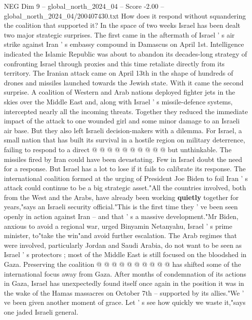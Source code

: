 \begin{textsample}{NEG Dim 9 – global\_north\_2024\_04 – Score -2.00 – global\_north\_2024\_04/200407430.txt}  \label{ex:f9_neg_222}
How does it respond without squandering the coalition that supported it?
In the space of two weeks Israel has been dealt two major strategic surprises.
The first came in the aftermath of Israel ' s air strike against Iran ' s embassy compound in Damascus on April 1st.
Intelligence indicated the Islamic Republic was about to abandon its decades-long strategy of confronting Israel through proxies and this time retaliate directly from its territory.
The Iranian attack came on April 13th in the shape of hundreds of drones and missiles launched towards the Jewish state.
With it came the second surprise.
A coalition of Western and Arab nations deployed fighter jets in the skies over the Middle East and, along with Israel ' s missile-defence systems, intercepted nearly all the incoming threats.
Together they reduced the immediate impact of the attack to one wounded girl and some minor damage to an Israeli air base.
But they also left Israeli decision-makers with a dilemma.
For Israel, a small nation that has built its survival in a hostile region on military deterrence, failing to respond to a direct @ @ @ @ @ @ @ @ @ @ but unthinkable.
The missiles fired by Iran could have been devastating.
Few in Israel doubt the need for a response.
But Israel has a lot to lose if it fails to calibrate its response.
The international coalition formed at the urging of President Joe Biden to foil Iran ' s attack could continue to be a big strategic asset."All the countries involved, both from the West and the Arabs, have already been working \textbf{quietly} together for years,"says an Israeli security official."This is the first time they ' ve been seen openly in action against Iran -- and that ' s a massive development."Mr Biden, anxious to avoid a regional war, urged Binyamin Netanyahu, Israel ' s prime minister, to"take the win"and avoid further escalation.
The Arab regimes that were involved, particularly Jordan and Saudi Arabia, do not want to be seen as Israel ' s protectors ; most of the Middle East is still focused on the bloodshed in Gaza.
Preserving the coalition @ @ @ @ @ @ @ @ @ @ has shifted some of the international focus away from Gaza.
After months of condemnation of its actions in Gaza, Israel has unexpectedly found itself once again in the position it was in the wake of the Hamas massacres on October 7th -- supported by its allies."We ' ve been given another moment of grace.
Let ' s see how quickly we waste it,"says one jaded Israeli general.

\end{textsample}
